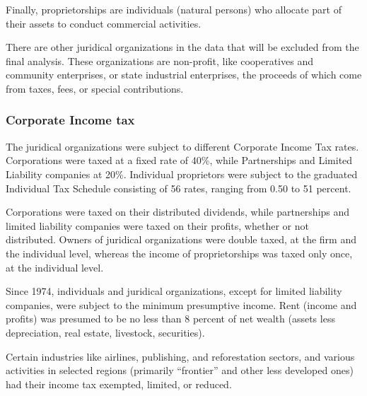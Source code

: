\documentclass[
  12pt]{article}
\theoremstyle{definition}
\theoremstyle{remark}
\begin{document}
Finally, proprietorships are individuals (natural persons) who allocate
part of their assets to conduct commercial activities.

There are other juridical organizations in the data that will be
excluded from the final analysis. These organizations are non-profit,
like cooperatives and community enterprises, or state industrial
enterprises, the proceeds of which come from taxes, fees, or special
contributions.

\subsubsection{Corporate Income tax}\label{corporate-income-tax}

The juridical organizations were subject to different Corporate Income
Tax rates. Corporations were taxed at a fixed rate of 40\%, while
Partnerships and Limited Liability companies at 20\%. Individual
proprietors were subject to the graduated Individual Tax Schedule
consisting of 56 rates, ranging from 0.50 to 51 percent.

Corporations were taxed on their distributed dividends, while
partnerships and limited liability companies were taxed on their
profits, whether or not distributed. Owners of juridical organizations
were double taxed, at the firm and the individual level, whereas the
income of proprietorships was taxed only once, at the individual level.

Since 1974, individuals and juridical organizations, except for limited
liability companies, were subject to the minimum presumptive income.
Rent (income and profits) was presumed to be no less than 8 percent of
net wealth (assets less depreciation, real estate, livestock,
securities).

Certain industries like airlines, publishing, and reforestation sectors,
and various activities in selected regions (primarily ``frontier'' and
other less developed ones) had their income tax exempted, limited, or
reduced.
\end{document}
